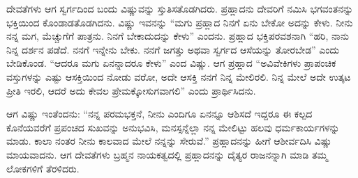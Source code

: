 ದೇವತೆಗಳು ಆಗ ಸ್ವರ್ಗದಿಂದ ಬಂದು ವಿಷ್ಣುವನ್ನು ಸ್ತುತಿಸತೊಡಗಿದರು. ಪ್ರಹ್ಲಾದನು ದೇವರಿಗೆ ನಮಿಸಿ ಭಗವಂತನನ್ನು ಭಕ್ತಿಯಿಂದ ಕೊಂಡಾಡತೊಡಗಿದನು. ವಿಷ್ಣು ಇವನನ್ನು “ಮಗು ಪ್ರಹ್ಲಾದ ನಿನಗೆ ಏನು ಬೇಕೋ ಅದನ್ನು ಕೇಳು. ನೀನು ನನ್ನ ಮಗ, ಮೆಚ್ಚುಗೆಗೆ ಪಾತ್ರನು. ನಿನಗೆ ಬೇಕಾದುದನ್ನು ಕೇಳು” ಎಂದನು. ಪ್ರಹ್ಲಾದ ಭಕ್ತಿಪರವಶನಾಗಿ “ಹರಿ, ನಾನು ನಿನ್ನ ದರ್ಶನ ಪಡೆದೆ. ನನಗೆ ಇನ್ನೇನು ಬೇಕು. ನನಗೆ ಜಗತ್ತು ಅಥವಾ ಸ್ವರ್ಗದ ಆಸೆಯನ್ನು ತೋರಬೇಡ” ಎಂದು ಬೇಡಿಕೊಂಡ. “ಆದರೂ ಮಗು ಏನನ್ನಾದರೂ ಕೇಳು” ಎಂದ ವಿಷ್ಣು. ಆಗ ಪ್ರಹ್ಲಾದ “ಅವಿವೇಕಿಗಳು ಪ್ರಾಪಂಚಿಕ ವಸ್ತುಗಳನ್ನು ಎಷ್ಟು ಆಸಕ್ತಿಯಿಂದ ನೋಡು ವರೋ, ಅದೇ ಆಸಕ್ತಿ ನನಗೆ ನಿನ್ನ ಮೇಲಿರಲಿ. ನಿನ್ನ ಮೇಲೆ ಅದೇ ಉತ್ಕಟ ಪ್ರೀತಿ ಇರಲಿ, ಆದರೆ ಅದು ಕೇವಲ ಪ್ರೇಮಕ್ಕೋಸುಗವಾಗಲಿ” ಎಂದು ಪ್ರಾರ್ಥಿಸಿದನು.

ಆಗ ವಿಷ್ಣು ಇಂತೆಂದನು: “ನನ್ನ ಪರಮಭಕ್ತನೆ, ನೀನು ಎಂದಿಗೂ ಏನನ್ನೂ ಆಶಿಸದೆ ಇದ್ದರೂ ಈ ಕಲ್ಪದ ಕೊನೆಯವರೆಗೆ ಪ್ರಪಂಚದ ಸುಖವನ್ನು ಅನುಭವಿಸಿ, ಮನಸ್ಸನ್ನೆಲ್ಲಾ ನನ್ನ ಮೇಲಿಟ್ಟು ಹಲವು ಧರ್ಮಕಾರ್ಯಗಳನ್ನು ಮಾಡು. ಕಾಲಾ ನಂತರ ನೀನು ಕಾಲವಾದ ಮೇಲೆ ನನ್ನನ್ನು ಸೇರುವೆ.” ಪ್ರಹ್ಲಾದನನ್ನು ಹೀಗೆ ಆಶೀರ್ವದಿಸಿ ವಿಷ್ಣು ಮಾಯವಾದನು. ಆಗ ದೇವತೆಗಳು ಬ್ರಹ್ಮನ ನಾಯಕತ್ವದಲ್ಲಿ ಪ್ರಹ್ಲಾದನನ್ನು ದೈತ್ಯರ ರಾಜನನ್ನಾಗಿ ಮಾಡಿ ತಮ್ಮ ಲೋಕಗಳಿಗೆ ತೆರಳಿದರು.

